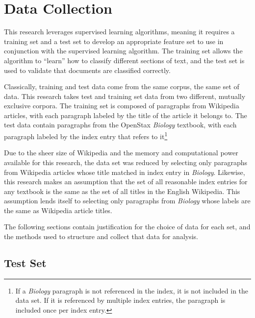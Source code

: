 \section{Data Collection}

This research leverages supervised learning algorithms, meaning it requires a training set and a test set to develop an appropriate feature set to use in conjunction with the supervised learning algorithm.
The training set allows the algorithm to ``learn'' how to classify different sections of text, and the test set is used to validate that documents are classified correctly.

Classically, training and test data come from the same corpus, the same set of data\cite{jurafsky}.
This research takes test and training set data from two different, mutually exclusive corpora.
The training set is composed of paragraphs from Wikipedia articles, with each paragraph labeled by the title of the article it belongs to.
The test data contain paragraphs from the OpenStax {\it Biology} textbook\cite{biology}, with each paragraph labeled by the index entry that refers to it\footnote{If a {\it Biology} paragraph is not referenced in the index, it is not included in the data set. If it is referenced by multiple index entries, the paragraph is included once per index entry.}

Due to the sheer size of Wikipedia and the memory and computational power available for this research, the data set was reduced by selecting only paragraphs from Wikipedia articles whose title matched in index entry in {\it Biology}.
Likewise, this research makes an assumption that the set of all reasonable index entries for any textbook is the same as the set of all titles in the English Wikipedia.
This assumption lends itself to selecting only paragraphs from {\it Biology} whose labels are the same as Wikipedia article titles.

The following sections contain justification for the choice of data for each set, and the methods used to structure and collect that data for analysis.

\subsection{Test Set}

